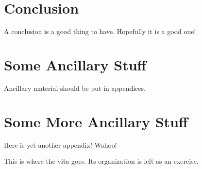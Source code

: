 \documentclass{uicthesi}
\begin{document}
\chapter{Conclusion}

A conclusion is a good thing to have. Hopefully it is a good one!

\appendices
\newpage
\appendix

\chapter{Some Ancillary Stuff}

Ancillary material should be put in appendices.

\chapter{Some More Ancillary Stuff}

Here is yet another appendix! Wahoo!

\nocite{*}
\bibformb

\newpage
\vita
This is where the vita goes.  Its organization is left as an exercise.
\end{document}
